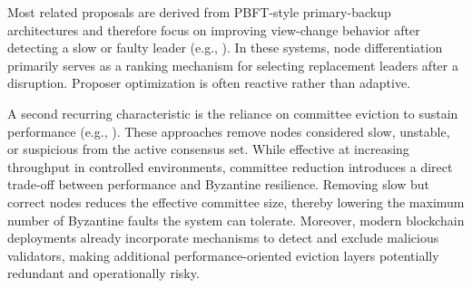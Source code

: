 Most related proposals are derived from PBFT-style primary-backup architectures and therefore focus on improving view-change behavior after detecting a slow or faulty leader (e.g., \cite{eischer2018latency, shan2025grouped, zhang2024prestigebft, zhu2025rgpbft}). 
In these systems, node differentiation primarily serves as a ranking mechanism for selecting replacement leaders after a disruption. 
Proposer optimization is often reactive rather than adaptive.

A second recurring characteristic is the reliance on committee eviction to sustain performance (e.g., \cite{du2020performance, huang2023improved, qiao2024enhancing, wen2025mapbft, zhao2022pbft}). 
These approaches remove nodes considered slow, unstable, or suspicious from the active consensus set. 
While effective at increasing throughput in controlled environments, committee reduction introduces a direct trade-off between performance and Byzantine resilience. Removing slow but correct nodes reduces the effective committee size, thereby lowering the maximum number of Byzantine faults the system can tolerate. 
Moreover, modern blockchain deployments already incorporate mechanisms to detect and exclude malicious validators, making additional performance-oriented eviction layers potentially redundant and operationally risky.


